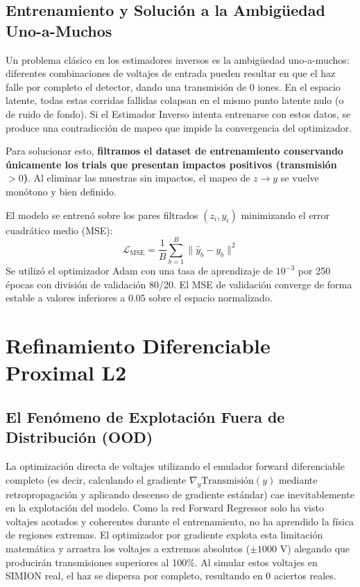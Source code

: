 \documentclass[12pt,letterpaper]{article}
\begin{document}
\subsection{Entrenamiento y Solución a la Ambigüedad Uno-a-Muchos}
Un problema clásico en los estimadores inversos es la ambigüedad uno-a-muchos: diferentes combinaciones de voltajes de entrada pueden resultar en que el haz falle por completo el detector, dando una transmisión de $0$ iones. En el espacio latente, todas estas corridas fallidas colapsan en el mismo punto latente nulo (o de ruido de fondo). Si el Estimador Inverso intenta entrenarse con estos datos, se produce una contradicción de mapeo que impide la convergencia del optimizador.

Para solucionar esto, \textbf{filtramos el dataset de entrenamiento conservando únicamente los trials que presentan impactos positivos (transmisión $> 0$)}. Al eliminar las muestras sin impactos, el mapeo de $z \rightarrow y$ se vuelve monótono y bien definido. 

El modelo se entrenó sobre los pares filtrados $(z_i, y_i)$ minimizando el error cuadrático medio (MSE):
\begin{equation}
    \mathcal{L}_{\text{MSE}} = \frac{1}{B} \sum_{b=1}^{B} \|\hat{y}_b - y_b\|^2
\end{equation}
Se utilizó el optimizador Adam con una tasa de aprendizaje de $10^{-3}$ por 250 épocas con división de validación 80/20. El MSE de validación converge de forma estable a valores inferiores a $0.05$ sobre el espacio normalizado.

\section{Refinamiento Diferenciable Proximal L2}
\label{sec:refinement}
\subsection{El Fenómeno de Explotación Fuera de Distribución (OOD)}
La optimización directa de voltajes utilizando el emulador forward diferenciable completo (es decir, calculando el gradiente $\nabla_y \text{Transmisión}(y)$ mediante retropropagación y aplicando descenso de gradiente estándar) cae inevitablemente en la explotación del modelo. Como la red Forward Regressor solo ha visto voltajes acotados y coherentes durante el entrenamiento, no ha aprendido la física de regiones extremas. El optimizador por gradiente explota esta limitación matemática y arrastra los voltajes a extremos absolutos ($\pm 1000\text{ V}$) alegando que producirán transmisiones superiores al 100\%. Al simular estos voltajes en SIMION real, el haz se dispersa por completo, resultando en 0 aciertos reales.
\end{document}

